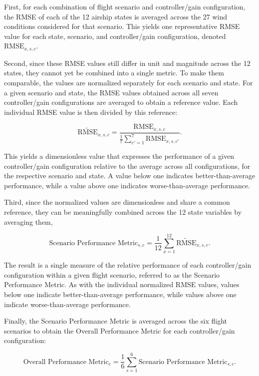 First, for each combination of flight scenario and controller/gain configuration, the RMSE of each of the 12 airship states is averaged across the 27 wind conditions considered for that scenario. This yields one representative RMSE value for each state, scenario, and controller/gain configuration, denoted $\mathrm{RMSE}_{x,s,c}$.

Second, since these RMSE values still differ in unit and magnitude across the 12 states, they cannot yet be combined into a single metric. To make them comparable, the values are normalized separately for each scenario and state. For a given scenario and state, the RMSE values obtained across all seven controller/gain configurations are averaged to obtain a reference value. Each individual RMSE value is then divided by this reference:

\begin{equation}
	\widetilde{\mathrm{RMSE}}_{x,s,c} = \frac{\mathrm{RMSE}_{x,s,c}}{\frac{1}{7}\sum_{c'=1}^{7} \mathrm{RMSE}_{x,s,c'}}.
	\label{eq:norm_rmse}
\end{equation}

This yields a dimensionless value that expresses the performance of a given controller/gain configuration relative to the average across all configurations, for the respective scenario and state. A value below one indicates better-than-average performance, while a value above one indicates worse-than-average performance.

Third, since the normalized values are dimensionless and share a common reference, they can be meaningfully combined across the 12 state variables by averaging them,

\begin{equation}
	\text{Scenario Performance Metric}_{s,c} = \frac{1}{12}\sum_{x=1}^{12} \widetilde{\mathrm{RMSE}}_{x,s,c}.
\end{equation}

The result is a single measure of the relative performance of each controller/gain configuration within a given flight scenario, referred to as the Scenario Performance Metric. As with the individual normalized RMSE values, values below one indicate better-than-average performance, while values above one indicate worse-than-average performance.

Finally, the Scenario Performance Metric is averaged across the six flight scenarios to obtain the Overall Performance Metric for each controller/gain configuration: 

\begin{equation}
	\text{Overall Performance Metric}_{c} = \frac{1}{6}\sum_{s=1}^{6} \text{Scenario Performance Metric}_{s,c}.
\end{equation}

